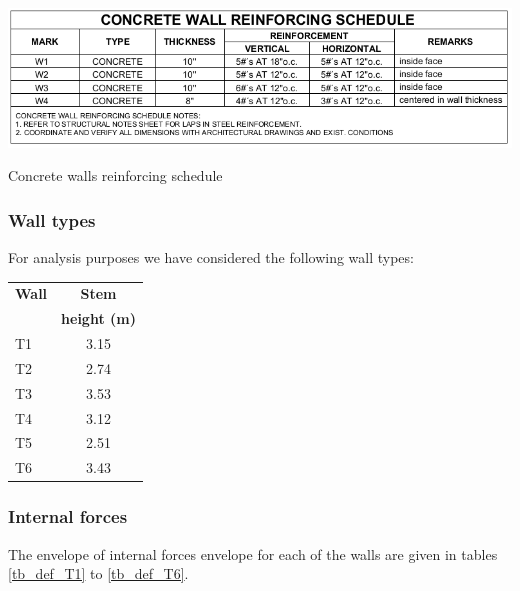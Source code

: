 \begin{table}
    \includegraphics[width=\linewidth]{figures/concrete_wall_reinforcing_schedule.png}
    \caption{Concrete walls reinforcing schedule}\label{tb_concrete_wall_reinforcing_schedule}
\end{table}

\subsubsection{Wall types}
For analysis purposes we have considered the following wall types:

\begin{center}
  \begin{tabular}{|l|c|}
    \hline
    \textbf{Wall} & \textbf{Stem} \\
    & \textbf{height (m)} \\
    \hline
T1 & 3.15\\
T2 & 2.74\\
T3 & 3.53\\
T4 & 3.12\\
T5 & 2.51\\
T6 & 3.43\\
    \hline
  \end{tabular}
\end{center}

\subsubsection{Internal forces}
The envelope of internal forces envelope for each of the walls are given in tables \ref{tb_def_T1} to \ref{tb_def_T6}.

